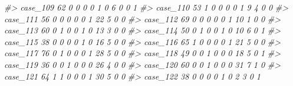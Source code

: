 \documentclass[]{book}
\newenvironment{Shaded}{\begin{snugshade}}{\end{snugshade}}
\newcommand{\CommentTok}[1]{\textcolor[rgb]{0.56,0.35,0.01}{\textit{#1}}}
\begin{document}
\begin{Shaded}
\begin{Highlighting}[]
\CommentTok{#> case_109  62        0        0                0                 0                 1              0                     6                      0           0             1}
\CommentTok{#> case_110  53        1        0                0                 0                 0              1                     9                      4           0             0}
\CommentTok{#> case_111  56        0        0                0                 0                 0              1                    22                      5           0             0}
\CommentTok{#> case_112  69        0        0                0                 0                 0              1                    10                      1           0             0}
\CommentTok{#> case_113  60        0        1                0                 0                 1              0                    13                      3           0             0}
\CommentTok{#> case_114  50        0        1                0                 0                 1              0                    10                      6           0             1}
\CommentTok{#> case_115  38        0        0                0                 0                 1              0                    16                      5           0             0}
\CommentTok{#> case_116  65        1        0                0                 0                 0              1                    21                      5           0             0}
\CommentTok{#> case_117  76        0        1                0                 0                 0              1                    28                      5           0             0}
\CommentTok{#> case_118  49        0        0                1                 0                 0              0                    18                      5           0             1}
\CommentTok{#> case_119  36        0        0                1                 0                 0              0                    26                      4           0             0}
\CommentTok{#> case_120  60        0        0                1                 0                 0              0                    31                      7           1             0}
\CommentTok{#> case_121  64        1        1                0                 0                 0              1                    30                      5           0             0}
\CommentTok{#> case_122  38        0        0                0                 0                 1              0                     2                      3           0             1}

\end{Highlighting}
\end{Shaded}
\end{document}
